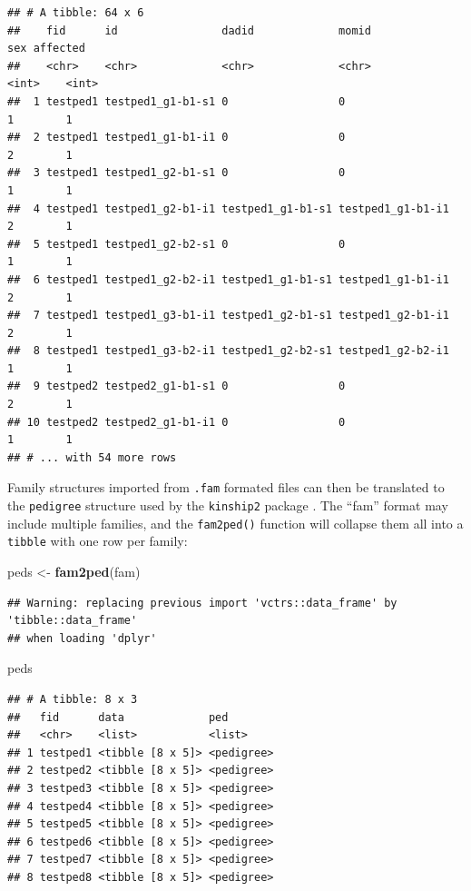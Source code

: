 \documentclass[9pt,a4paper,]{extarticle}
\newenvironment{Shaded}{\begin{snugshade}}{\end{snugshade}}
\newcommand{\KeywordTok}[1]{\textcolor[rgb]{0.13,0.29,0.53}{\textbf{#1}}}
\newcommand{\NormalTok}[1]{#1}
\newcommand{\StringTok}[1]{\textcolor[rgb]{0.31,0.60,0.02}{#1}}
\begin{document}
\begin{verbatim}
## # A tibble: 64 x 6
##    fid      id                dadid             momid               sex affected
##    <chr>    <chr>             <chr>             <chr>             <int>    <int>
##  1 testped1 testped1_g1-b1-s1 0                 0                     1        1
##  2 testped1 testped1_g1-b1-i1 0                 0                     2        1
##  3 testped1 testped1_g2-b1-s1 0                 0                     1        1
##  4 testped1 testped1_g2-b1-i1 testped1_g1-b1-s1 testped1_g1-b1-i1     2        1
##  5 testped1 testped1_g2-b2-s1 0                 0                     1        1
##  6 testped1 testped1_g2-b2-i1 testped1_g1-b1-s1 testped1_g1-b1-i1     2        1
##  7 testped1 testped1_g3-b1-i1 testped1_g2-b1-s1 testped1_g2-b1-i1     2        1
##  8 testped1 testped1_g3-b2-i1 testped1_g2-b2-s1 testped1_g2-b2-i1     1        1
##  9 testped2 testped2_g1-b1-s1 0                 0                     2        1
## 10 testped2 testped2_g1-b1-i1 0                 0                     1        1
## # ... with 54 more rows
\end{verbatim}

Family structures imported from \texttt{.fam} formated files can then be translated to the \texttt{pedigree} structure used by the \texttt{kinship2} package \citep{sinnwell2014}. The ``fam'' format may include multiple families, and the \texttt{fam2ped()} function will collapse them all into a \texttt{tibble} with one row per family:

\begin{Shaded}
\begin{Highlighting}[]
\NormalTok{peds <-}\StringTok{ }\KeywordTok{fam2ped}\NormalTok{(fam)}
\end{Highlighting}
\end{Shaded}

\begin{verbatim}
## Warning: replacing previous import 'vctrs::data_frame' by 'tibble::data_frame'
## when loading 'dplyr'
\end{verbatim}

\begin{Shaded}
\begin{Highlighting}[]
\NormalTok{peds}
\end{Highlighting}
\end{Shaded}

\begin{verbatim}
## # A tibble: 8 x 3
##   fid      data             ped       
##   <chr>    <list>           <list>    
## 1 testped1 <tibble [8 x 5]> <pedigree>
## 2 testped2 <tibble [8 x 5]> <pedigree>
## 3 testped3 <tibble [8 x 5]> <pedigree>
## 4 testped4 <tibble [8 x 5]> <pedigree>
## 5 testped5 <tibble [8 x 5]> <pedigree>
## 6 testped6 <tibble [8 x 5]> <pedigree>
## 7 testped7 <tibble [8 x 5]> <pedigree>
## 8 testped8 <tibble [8 x 5]> <pedigree>
\end{verbatim}
\end{document}
